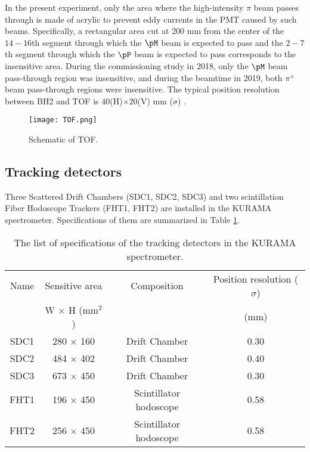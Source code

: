 In the present experiment, only the area where the high-intensity $\pi$ beam passes through is made of acrylic to prevent eddy currents in the PMT caused by such beams. 
Specifically, a rectangular area cut at 200 mm from the center of the $14-16$th segment through which the $\pM$ beam is expected to pass and the $2-7$th segment through which the $\pP$ beam is expected to pass corresponds to the insensitive area. During the commissioning study in 2018, only the $\pM$ beam pass-through region was insensitive, and during the beamtime in 2019, both $\pi^{\pm}$ beam pass-through regions were insensitive. The typical position resolution between BH2 and TOF is $40$(H)$\times20$(V) mm ($\sigma$) \cite{Nana-D}. 

\begin{figure}[!h]
 \begin{center}
   \texttt{[image: TOF.png]}
   \caption{Schematic of TOF.}
   \label{fig-TOF}
 \end{center}
\end{figure}

\subsection{Tracking detectors}
Three Scattered Drift Chambers (SDC1, SDC2, SDC3) and two scintillation Fiber Hodoscope Trackers (FHT1, FHT2) are installed in the KURAMA spectrometer. Specifications of them are summarized in Table \ref{tab-KURAMAspec-track}.

\begin{table}[h]
  \begin{center}
    \caption{The list of specifications of the tracking detectors in the KURAMA spectrometer.}
    \begin{tabular}{cccc} \hline \hline
      Name & Sensitive area & Composition & Position resolution ($\sigma$) \\
       & W $\times$ H (mm$^2$) & & (mm) \\ \hline
      SDC1& 280 $\times$ 160 & Drift Chamber & 0.30 \\
      SDC2& 484 $\times$ 402 & Drift Chamber & 0.40 \\
      SDC3 & 673 $\times$ 450 & Drift Chamber & 0.30 \\ 
      FHT1 & 196 $\times$ 450 & Scintillator hodoscope & 0.58 \\
      FHT2 & 256 $\times$ 450 & Scintillator hodoscope & 0.58 \\ 
\hline\hline
   \end{tabular}
   \label{tab-KURAMAspec-track}
   \end{center}
\end{table}

